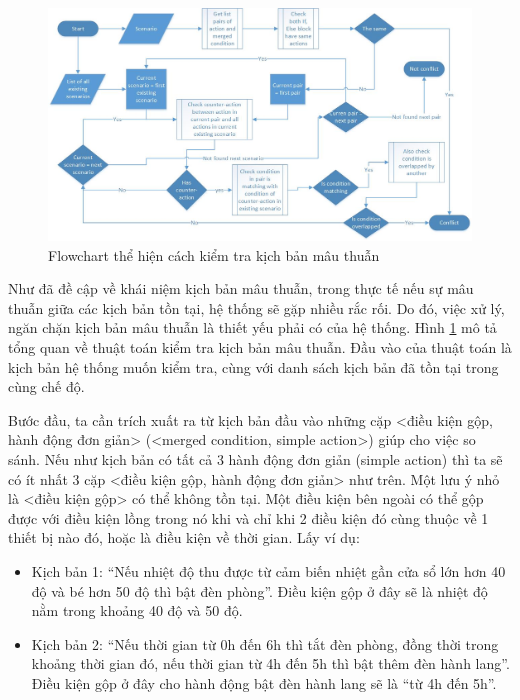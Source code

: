 \documentclass[12pt,a4paper,oneside]{extbook}
\begin{document}
\begin{figure}[h]
  \centering
     \includegraphics[width=15cm]{6-Flowchart-Scenario-Validator-How-to-check-conflict}
  \caption{Flowchart thể hiện cách kiểm tra kịch bản mâu thuẫn}\label{fig:6-Flowchart-Scenario-Validator-How-to-check-conflict}
\end{figure}

Như đã đề cập về khái niệm kịch bản mâu thuẫn, trong thực tế nếu sự mâu thuẫn giữa các kịch bản tồn tại, hệ thống sẽ gặp nhiều rắc rối. Do đó, việc xử lý, ngăn chặn kịch bản mâu thuẫn là thiết yếu phải có của hệ thống. Hình \ref{fig:6-Flowchart-Scenario-Validator-How-to-check-conflict} mô tả tổng quan về thuật toán kiểm tra kịch bản mâu thuẫn. Đầu vào của thuật toán là kịch bản hệ thống muốn kiểm tra, cùng với danh sách kịch bản đã tồn tại trong cùng chế độ.

Bước đầu, ta cần trích xuất ra từ kịch bản đầu vào những cặp <điều kiện gộp, hành động đơn giản> (<merged condition, simple action>) giúp cho việc so sánh. Nếu như kịch bản có tất cả 3 hành động đơn giản (simple action) thì ta sẽ có ít nhất 3 cặp <điều kiện gộp, hành động đơn giản> như trên. Một lưu ý nhỏ là <điều kiện gộp> có thể không tồn tại. Một điều kiện bên ngoài có thể gộp được với điều kiện lồng trong nó khi và chỉ khi 2 điều kiện đó cùng thuộc về 1 thiết bị nào đó, hoặc là điều kiện về thời gian. Lấy ví dụ:

	\begin{itemize}[topsep=1mm,itemsep=-0.5mm]
	\item Kịch bản 1: “Nếu nhiệt độ thu được từ cảm biến nhiệt gần cửa sổ lớn hơn 40 độ và bé hơn 50 độ thì bật đèn phòng”. Điều kiện gộp ở đây sẽ là nhiệt độ nằm trong khoảng 40 độ và 50 độ.
	\item Kịch bản 2: “Nếu thời gian từ 0h đến 6h thì tắt đèn phòng, đồng thời trong khoảng thời gian đó, nếu thời gian từ 4h đến 5h thì bật thêm đèn hành lang”. Điều kiện gộp ở đây cho hành động bật đèn hành lang sẽ là “từ 4h đến 5h”.
	\vspace{1mm}
	\end{itemize}
\end{document}
